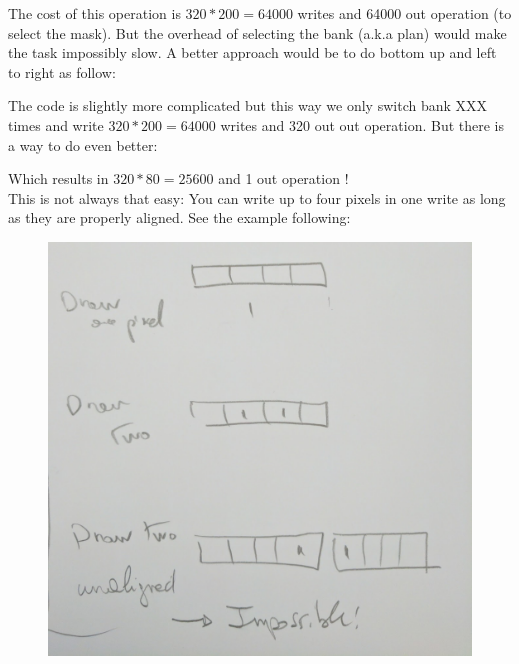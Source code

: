 \documentclass[book.tex]{subfiles}
\begin{document}
The cost of this operation is $320*200=64000$ writes and 64000 out operation (to select the mask).
But the overhead of selecting the bank (a.k.a plan) would make the task impossibly slow. A better approach would be to do bottom up and left to right as follow:\\
\par
\begin{minipage}{\textwidth}

\end{minipage}

The code is slightly more complicated but this way we only switch bank XXX times and write $320*200=64000$ writes and 320 out out operation. But there is a way to do even better:\\
\par
\begin{minipage}{\textwidth}

\end{minipage}

Which results in $320*80=25600$ and 1 out operation !\\

This is not always that easy: You can write up to four pixels in one write as long as they are properly aligned. See the example following:
\begin{figure}[H]
  \centering
 \includegraphics[width=\textwidth]{imgs/drawings/vga_multiple_pixel_write.png}
\end{figure}
\end{document}
